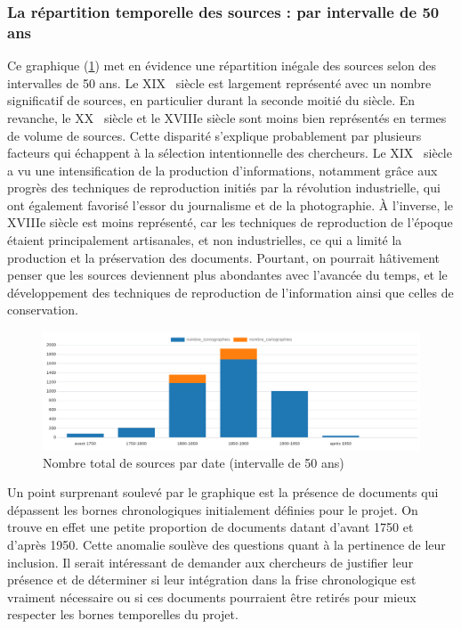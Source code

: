 \subsubsection{La répartition temporelle des sources : par intervalle de 50 ans}
Ce graphique (\ref{fig:total_sources_date50}) met en évidence une répartition inégale des sources selon des intervalles de 50 ans. Le XIX\ieme~ siècle est largement représenté avec un nombre significatif de sources, en particulier durant la seconde moitié du siècle. En revanche, le XX\ieme~ siècle et le XVIIIe siècle sont moins bien représentés en termes de volume de sources. Cette disparité s'explique probablement par plusieurs facteurs qui échappent à la sélection intentionnelle des chercheurs. Le XIX\ieme~ siècle a vu une intensification de la production d'informations, notamment grâce aux progrès des techniques de reproduction initiés par la révolution industrielle, qui ont également favorisé l'essor du journalisme et de la photographie. À l'inverse, le XVIIIe siècle est moins représenté, car les techniques de reproduction de l'époque étaient principalement artisanales, et non industrielles, ce qui a limité la production et la préservation des documents. Pourtant, on pourrait hâtivement penser que les sources deviennent plus abondantes avec l'avancée du temps, et le développement des techniques de reproduction de l'information ainsi que celles de conservation.
\begin{figure}[ht!]
    \centering
    \includegraphics[width=1\linewidth]{images/graphiques/total_source_date_50.png}
    \caption{Nombre total de sources par date (intervalle de 50 ans)}
    \label{fig:total_sources_date50}
\end{figure}
Un point surprenant soulevé par le graphique est la présence de documents qui dépassent les bornes chronologiques initialement définies pour le projet. On trouve en effet une petite proportion de documents datant d'avant 1750 et d'après 1950. Cette anomalie soulève des questions quant à la pertinence de leur inclusion. Il serait intéressant de demander aux chercheurs de justifier leur présence et de déterminer si leur intégration dans la frise chronologique est vraiment nécessaire ou si ces documents pourraient être retirés pour mieux respecter les bornes temporelles du projet.

